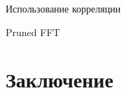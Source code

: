 \begin{frame}{Использование корреляции}
\end{frame}

\begin{frame}{Pruned FFT}
\end{frame}




\section{Заключение}

